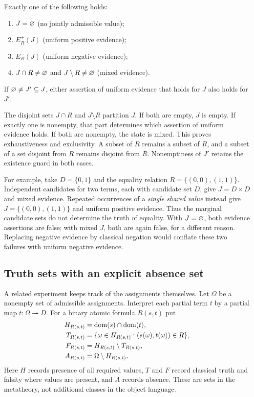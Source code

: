 \begin{theorem}
Exactly one of the following holds:
\begin{enumerate}
\item $J=\varnothing$ (no jointly admissible value);
\item $E_R^+(J)$ (uniform positive evidence);
\item $E_R^-(J)$ (uniform negative evidence);
\item $J\cap R\neq\varnothing$ and $J\setminus R\neq\varnothing$
      (mixed evidence).
\end{enumerate}
If $\varnothing\neq J'\subseteq J$, either assertion of uniform evidence
that holds for $J$ also holds for $J'$.
\end{theorem}
\Proof
The disjoint sets $J\cap R$ and $J\setminus R$ partition $J$. If both
are empty, $J$ is empty. If exactly one is nonempty, that part determines
which assertion of uniform evidence holds. If both are nonempty, the
state is mixed. This proves exhaustiveness and exclusivity. A subset
of $R$ remains a subset of $R$, and a subset of a set disjoint from $R$
remains disjoint from $R$. Nonemptiness of $J'$ retains the existence
guard in both cases.
\Done

For example, take $D=\{0,1\}$ and the equality relation
$R=\{(0,0),(1,1)\}$. Independent candidates for two terms, each with
candidate set $D$, give $J=D\times D$ and mixed evidence. Repeated
occurrences of a \emph{single shared value} instead give
$J=\{(0,0),(1,1)\}$ and uniform positive evidence. Thus the marginal
candidate sets do not determine the truth of equality. With
$J=\varnothing$, both evidence assertions are false; with mixed $J$,
both are again false, for a different reason. Replacing negative evidence
by classical negation would conflate these two failures with uniform
negative evidence.

\subsection{Truth sets with an explicit absence set}
A related experiment keeps track of the assignments themselves. Let
$\Omega$ be a nonempty set of admissible assignments. Interpret each
partial term $t$ by a partial map $t:\Omega\rightharpoonup D$. For a
binary atomic formula $R(s,t)$ put
\[
\begin{split}
H_{R(s,t)}&=\mathrm{dom}(s)\cap\mathrm{dom}(t),\\
T_{R(s,t)}&=\{\omega\in H_{R(s,t)}:(s(\omega),t(\omega))\in R\},\\
F_{R(s,t)}&=H_{R(s,t)}\setminus T_{R(s,t)},\\
A_{R(s,t)}&=\Omega\setminus H_{R(s,t)}.
\end{split}
\]
Here $H$ records presence of all required values, $T$ and $F$ record
classical truth and falsity where values are present, and $A$ records
absence. These are sets in the metatheory, not additional classes in the
object language.

